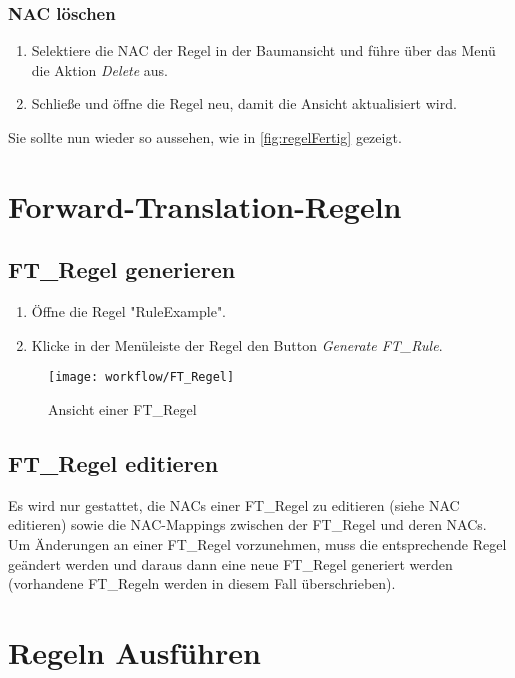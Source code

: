 		\subsubsection{NAC löschen}
		\begin{enumerate}
			\item Selektiere die NAC der Regel in der Baumansicht und führe über das Menü die Aktion \textit{Delete} aus.
			\item Schließe und öffne die Regel neu, damit die Ansicht aktualisiert wird.
		\end{enumerate}
		
		Sie sollte nun wieder so aussehen, wie in \autoref{fig:regelFertig}  gezeigt.
		
	\section{Forward-Translation-Regeln}
	
	\subsection{FT\_Regel generieren}
		\begin{enumerate}
			\item Öffne die Regel "RuleExample".
			\item Klicke in der Menüleiste der Regel den Button \textit{Generate FT\_Rule}.
		\end{enumerate}
	
			\begin{figure}[h!] %
				\centering
				\texttt{[image: workflow/FT\_Regel]}
				\caption{Ansicht einer FT\_Regel}
				\label{fig:ft_Regel}
			\end{figure}	
	
	\subsection{FT\_Regel editieren}
	Es wird nur gestattet, die NACs einer FT\_Regel zu editieren (siehe NAC editieren) sowie die NAC-Mappings zwischen der FT\_Regel und deren NACs.\\
	Um Änderungen an einer FT\_Regel vorzunehmen, muss die entsprechende Regel geändert werden und daraus dann eine neue FT\_Regel generiert werden (vorhandene FT\_Regeln werden in diesem Fall überschrieben).
	
	\section{Regeln Ausführen}
	

